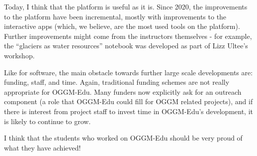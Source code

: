 Today, I think that the platform is useful as it is. Since 2020, the improvements to the platform have been incremental,
mostly with improvements to the interactive apps (which, we believe, are the most used tools on the platform). Further
improvements might come from the instructors themselves - for example, the “glaciers as water resources” notebook
was developed as part of Lizz Ultee’s workshop.

Like for software, the main obstacle towards further large scale developments are: funding, staff, and time.
Again, traditional funding schemes are not really appropriate for OGGM-Edu. Many funders now explicitly ask
for an outreach component (a role that OGGM-Edu could fill for OGGM related projects), and if there is
interest from project staff to invest time in OGGM-Edu’s development, it is likely to continue to grow.

I think that the students who worked on OGGM-Edu should be very proud of what they have achieved!